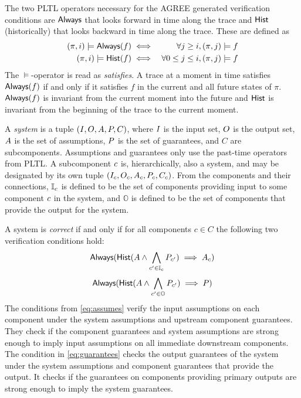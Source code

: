 The two PLTL operators necessary for the AGREE generated verification
conditions are $\mathsf{Always}$ that looks forward in time along
the trace and $\mathsf{Hist}$ (historically) that looks backward in
time along the trace.  These are defined as
\begin{eqnarray*}
 (\pi, i) \models \mathsf{Always}(f) & \iff & \forall j \ge i, (\pi, j) \models f \\
(\pi, i) \models \mathsf{Hist}(f) & \iff & \forall 0 \le j \le i, (\pi, j) \models f
\end{eqnarray*}
The $\models$-operator is read as \emph{satisfies}.  A trace at a
moment in time satisfies $\mathsf{Always}(f)$ if and only if it satisfies
$f$ in the current and all future states of $\pi$.  $\mathsf{Always}(f)$ is
invariant from the current moment into the future and $\mathsf{Hist}$ is
invariant from the beginning of the trace to the current moment.

A \emph{system} is a tuple $(I, O, A,
P,C)$, where $I$ is the input set, $O$ is the
output set, $A$ is the set of assumptions, $P$ is the
set of guarantees, and $C$ are subcomponents.  Assumptions and guarantees only use the past-time operators from PLTL. A subcomponent
$c$ is, hierarchically, also a system, and may be designated
by its own tuple $(I_{c}, O_{c},
A_{c}, P_{c}, C_c)$.  From the
components and their connections, $\mathbb{I}_{c}$ is defined
to be the set of components providing input to some component
$c$ in the system, and $\mathbb{O}$ is defined to be the set
of components that provide the output for the system.  

A system is
\emph{correct} if and only if for all components $c \in C$ the
following two verification conditions hold:
\begin{equation}\label{eq:assumes}
            \mathsf{Always}(\mathsf{Hist}(A \wedge
            \bigwedge_{c^\prime \in \mathbb{I}_{c}} P_{c^\prime})
            \implies A_{c})
\end{equation}
\begin{equation}\label{eq:guarantees}
            \mathsf{Always}(\mathsf{Hist}(A \wedge
            \bigwedge_{c^\prime \in \mathbb{O}} P_{c^\prime})
            \implies P)
\end{equation}
The conditions from \eqref{eq:assumes} verify the input assumptions on each component under
the system assumptions and upstream component guarantees.  They check
if the component guarantees and system assumptions are strong enough
to imply input assumptions on all immediate downstream components.
The condition in \eqref{eq:guarantees} checks the output guarantees of the system under the
system assumptions and component guarantees that provide the output.
It checks if the guarantees on components providing primary outputs
are strong enough to imply the system guarantees.


